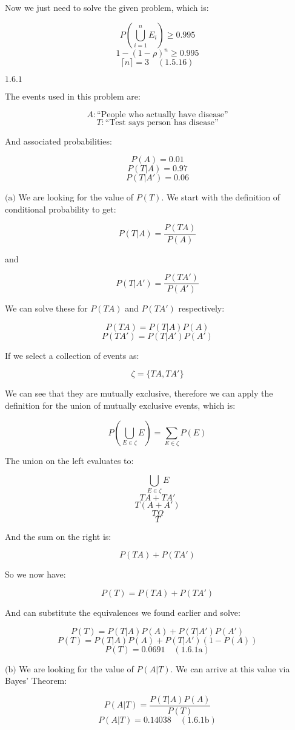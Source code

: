 \documentclass{article}
\newcommand{\problem}[2]{$\boxed{\text{#1.#2}}$}
\newcommand{\subproblem}[3]{$\boxed{\text{(#3)}}$}
\newcommand{\solution}[3]{\boxed{#3\quad(\text{#1.#2})}}
\newcommand{\subsolution}[4]{\boxed{#4\quad(\text{#1.#2#3})}}
\begin{document}
Now we just need to solve the given problem, which is:

\[
P\left(\bigcup\limits_{i=1}^n E_i\right)\ge 0.995
\] \[
1-(1-\rho)^n\ge 0.995
\] \[
\solution{1.5}{16}{\lceil n\rceil=3}
\]

%
\problem{1.6}{1}

The events used in this problem are:

\[
A:\text{``People who actually have disease''}
\] \[
T:\text{``Test says person has disease''}
\]

And associated probabilities:

\[
P(A)=0.01
\] \[
P(T|A)=0.97
\] \[
P(T|A')=0.06
\]

%
\subproblem{1.6}{1}{a} We are looking for the value of $P(T)$. We
start with the definition of conditional probability to get:

\[
P(T|A)=\dfrac{P(TA)}{P(A)}
\]

and

\[
P(T|A')=\dfrac{P(TA')}{P(A')}
\]

We can solve these for $P(TA)$ and $P(TA')$ respectively:

\[
P(TA)=P(T|A)P(A)
\] \[
P(TA')=P(T|A')P(A')
\]

If we select a collection of events as:

\[
\zeta=\{TA,TA'\}
\]

We can see that they are mutually exclusive, therefore we can apply
the definition for the union of mutually exclusive events, which is:

\[
P\left(\bigcup\limits_{E\in\zeta}E\right)=\sum\limits_{E\in\zeta}P(E)
\]

The union on the left evaluates to:

\[
\bigcup\limits_{E\in\zeta}E
\] \[
TA+TA'
\] \[
T(A+A')
\] \[
T\Omega
\] \[
T
\]

And the sum on the right is:

\[
P(TA)+P(TA')
\]

So we now have:

\[
P(T)=P(TA)+P(TA')
\]

And can substitute the equivalences we found earlier and solve:

\[
P(T)=P(T|A)P(A)+P(T|A')P(A')
\] \[
P(T)=P(T|A)P(A)+P(T|A')(1-P(A))
\] \[
\subsolution{1.6}{1}{a}{P(T)=0.0691}
\]

%
\subproblem{1.6}{1}{b} We are looking for the value of $P(A|T)$. We
can arrive at this value via Bayes' Theorem:

\[
P(A|T)=\dfrac{P(T|A)P(A)}{P(T)}
\] \[
\subsolution{1.6}{1}{b}{P(A|T)=0.14038}
\]
\end{document}
